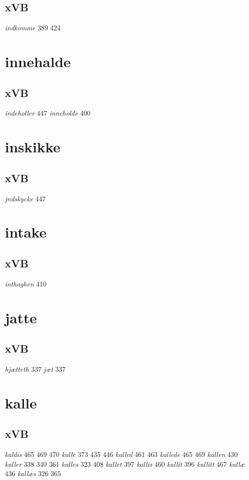 \documentclass[a4paper,twocolumn]{article}
\begin{document}
\subsection{xVB}
\label{sec:orgbd8a8bb}
\emph{indkomme} 389 424 
\section{innehalde}
\label{sec:org475ff0d}
\subsection{xVB}
\label{sec:orge7013bb}
\emph{indeholler} 447 \emph{inneholde} 400 
\section{inskikke}
\label{sec:org108fb85}
\subsection{xVB}
\label{sec:org480b8a0}
\emph{jndskycke} 447 
\section{intake}
\label{sec:orgf12d1d6}
\subsection{xVB}
\label{sec:org695ab16}
\emph{inthaghen} 410 
\section{jatte}
\label{sec:orgb685a8a}
\subsection{xVB}
\label{sec:org3cf38b6}
\emph{hjætteth} 337 \emph{jæt} 337 
\section{kalle}
\label{sec:org83b8959}
\subsection{xVB}
\label{sec:org119a4c8}
\emph{kaldis} 465 469 470 \emph{kalle} 373 435 446 \emph{kalled} 461 463 \emph{kallede} 465 469 \emph{kallen} 430 \emph{kaller} 338 340 361 \emph{kalles} 323 408 \emph{kallet} 397 \emph{kallis} 460 \emph{kallit} 396 \emph{kallitt} 467 \emph{kallæ} 436 \emph{kallæs} 326 365 
\end{document}
